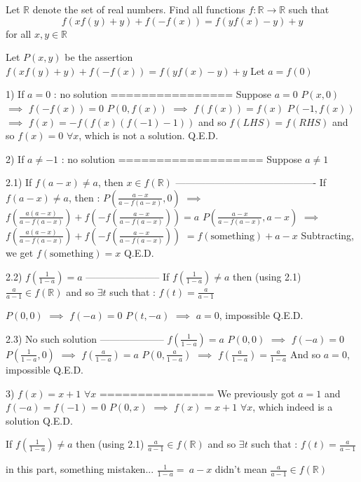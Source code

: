\begin{solution}
	\begin{tcolorbox}Let $\mathbb{R}$ denote the set of real numbers. Find all functions $f:\mathbb{R}\rightarrow\mathbb{R}$ such that 
\[f(xf(y)+y)+f(-f(x))=f(yf(x)-y)+y\]
for all $x,y\in\mathbb{R}$\end{tcolorbox}
Let $P(x,y)$ be the assertion $f(xf(y)+y)+f(-f(x))=f(yf(x)-y)+y$
Let $a=f(0)$

1) If $a=0$ : no solution 
================
Suppose $a=0$
$P(x,0)$ $\implies$ $f(-f(x))=0$
$P(0,f(x))$ $\implies$ $f(f(x))=f(x)$
$P(-1,f(x))$ $\implies$ $f(x)=-f(f(x)(f(-1)-1))$ and so $f(LHS)=f(RHS)$ and so $f(x)=0$ $\forall x$, which is not a solution.
Q.E.D.

2) If $a\ne -1$ : no solution
===================
Suppose $a\ne 1$

2.1) If $f(a-x)\ne a$, then $x\in f(\mathbb R)$
-------------------------------------------
If $f(a-x)\ne a$, then :
$P(\frac{a-x}{a-f(a-x)},0)$ $\implies$ $f(\frac{a(a-x)}{a-f(a-x)})+f(-f(\frac{a-x}{a-f(a-x)}))=a$
$P(\frac{a-x}{a-f(a-x)},a-x)$ $\implies$ $f(\frac{a(a-x)}{a-f(a-x)})+f(-f(\frac{a-x}{a-f(a-x)}))$ $=f(\text{something})+a-x$
Subtracting, we get $f(\text{something})=x$
Q.E.D.

2.2) $f(\frac 1{1-a})=a$
-----------------------
If $f(\frac 1{1-a})\ne a$ then (using 2.1) $\frac a{a-1}\in f(\mathbb R)$ and so $\exists t$ such that : $f(t)=\frac a{a-1}$

$P(0,0)$ $\implies$ $f(-a)=0$
$P(t,-a)$ $\implies$ $a=0$, impossible
Q.E.D.

2.3) No such solution
--------------------
$f(\frac 1{1-a})=a$
$P(0,0)$ $\implies$ $f(-a)=0$
$P(\frac 1{1-a},0)$ $\implies$  $f(\frac a{1-a})=a$
$P(0,\frac a{1-a})$ $\implies$  $f(\frac a{1-a})=\frac a{1-a}$
And so $a=0$, impossible
Q.E.D.

3) $f(x)=x+1$ $\forall x$
===============
We previously got $a=1$ and $f(-a)=f(-1)=0$
$P(0,x)$ $\implies$ $\boxed{f(x)=x+1}$ $\forall x$, which indeed is a solution
Q.E.D.
\end{solution}



\begin{solution}
	If $f(\frac 1{1-a})\ne a$ then (using 2.1) $\frac a{a-1}\in f(\mathbb R)$ and so $\exists t$ such that : $f(t)=\frac a{a-1}$


in this part, something mistaken... 
$\frac 1{1-a}=\ a-x$ didn't mean $\frac a{a-1}\in f(\mathbb R)$
\end{solution}



